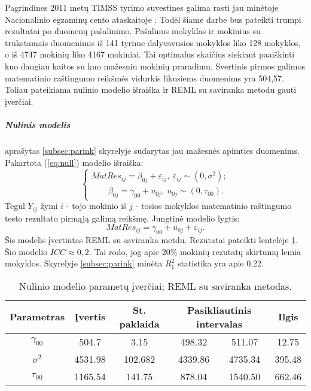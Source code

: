 \documentclass[12pt,a4paper]{article}
\begin{document}
\indent Pagrindines 2011 metų TIMSS tyrimo suvestines galima rasti jau minėtoje Nacionalinio egzaminų cento ataskaitoje \cite{timss2011lt}. Todėl šiame darbe bus pateikti trumpi rezultatai po duomenų pašalinimo. Pašalinus mokyklas ir mokinius su trūkstamais duomenimis iš 141 tyrime dalyvavusios mokyklos liko 128 mokyklos, o iš 4747 mokinių liko 4167 mokiniai. Tai optimalus skaičius siekiant paaiškinti kuo daugiau kaitos su kuo mažesniu mokinių praradimu. Svertinis pirmos galimos matematinio raštingumo reikšmės vidurkis likusiems duomenims yra 504,57. Toliau pateikiama nulinio modelio išraiška ir REML su saviranka metodu gauti įverčiai.

\subparagraph{Nulinis modelis} aprašytas \ref{subsec:parink} skyrelyje sudarytas jau mažesnės apimties duomenims. Pakartota (\ref{eq:null}) modelio išraiška:
\begin{equation}
\left\{
\begin{array}{l}
MatRes_{ij}=\beta_{0j}+\varepsilon_{ij}, \ \varepsilon_{ij}\sim (0, \sigma^2);\\
\  \ \ \ \ \ \ \ \ \beta_{0j}=\gamma_{00}+u_{0j}, \ u_{0j}\sim (0, \tau_{00}).
\end{array} \right.
\end{equation}
Tegul $Y_{ij}$ žymi $i$ - tojo mokinio iš $j$ - tosios mokyklos matematinio raštingumo testo rezultato pirmąją galimą reikšmę. Jungtinė modelio lygtis:
\[
MatRes_{ij}=\gamma_{00}+u_{0j}+\varepsilon_{ij}.
\]
Šis modelis įvertintas REML su saviranka metdu. Rezutatai pateikti lentelėje \ref{table:null}. Šio modelio $ICC \approx 0,2$. Tai rodo, jog apie 20\% mokinių rezutatų skirtumų lemia mokyklos. Skyrelyje \ref{subsec:parink} minėta $R^2_1$ statistika yra apie 0,22.

\begin{small}
\begin{table}[H]
\label{table:null}
\centering
\begin{tabular}{c|cc|cc|c}
\hline
Parametras & Įvertis & St. paklaida & \multicolumn{2}{c|}{Pasikliautinis intervalas}&Ilgis\\
\hline
$\gamma_{00}$ &504.7&3.15&498.32&511.07&12.75\\
$\sigma^2$ &4531.98&102.682&4339.86&4735.34&395.48\\
$\tau_{00}$&1165.54&141.75&878.04&1540.50&662.46\\
\hline
\end{tabular}
\caption{Nulinio modelio parametų įverčiai; REML su saviranka metodas.}
\end{table}
\end{small}
\end{document}
